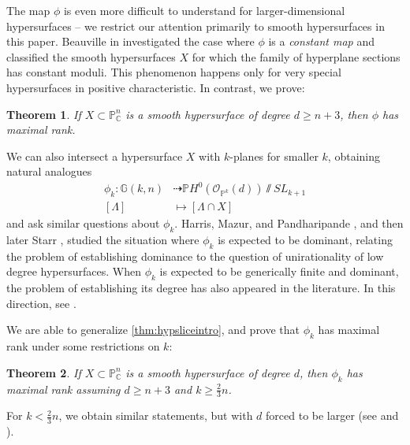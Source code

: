 \documentclass[11pt,reqno]{amsart}
\theoremstyle{plain}
\newtheorem{theorem}{Theorem}[section]
\theoremstyle{definition}
\theoremstyle{remark}
\numberwithin{equation}{section}
\numberwithin{equation}{section}
\newcommand{\OO}{\mathscr{O}}
\newcommand{\PP}{\mathbb{P}}
\newcommand{\CC}{\mathbb{C}}
\newcommand{\git}{\sslash}
\begin{document}
The map $\phi$ is even more difficult to understand for larger-dimensional hypersurfaces -- we restrict our attention primarily to smooth hypersurfaces in this paper. Beauville in \cite{beauville} investigated the case where $\phi$ is a {\sl constant map} and classified the smooth hypersurfaces $X$ for which the family of hyperplane sections has constant moduli.   This phenomenon happens only for very special hypersurfaces in positive characteristic. In contrast, we prove:

 \begin{theorem}
\label{thm:hypsliceintro}
If $X\subset \PP^n_{\CC}$ is a smooth hypersurface of degree $d\geq n+3$, then $\phi$ has maximal rank.
\end{theorem}

We can also intersect a hypersurface $X$ with $k$-planes for smaller $k$, obtaining natural analogues
\begin{align*}
    \phi_k: \mathbb{G}(k,n)&\dashrightarrow \PP H^0(\OO_{\PP^{k}}(d))\git SL_{k+1} \\
    [\Lambda] &\mapsto [\Lambda\cap X]
\end{align*}
and ask similar questions about $\phi_k$.   Harris, Mazur, and Pandharipande \cite{HMP95}, and then later Starr \cite{starr}, studied the situation where $\phi_k$ is expected to be dominant, relating the problem of establishing dominance to the question of unirationality of low degree hypersurfaces. When $\phi_{k}$ is expected to be generically finite and dominant, the problem of establishing its degree has also appeared in the literature.  In this direction, see \cite{CL08,FML,LPT19}.

We are able to generalize \autoref{thm:hypsliceintro}, and prove that $\phi_{k}$ has maximal rank under some restrictions on $k$:

\begin{theorem}
\label{thm:hypsliceintro2}
If $X\subset \PP_{\CC}^n$ is a smooth hypersurface of degree $d$, then $\phi_{k}$ has maximal rank assuming $d\geq n+3$ and $k\geq \frac{2}{3}n$.
\end{theorem}
For $k<\frac{2}{3}n$, we obtain similar statements, but with $d$ forced to be larger (see  and ).
\end{document}
